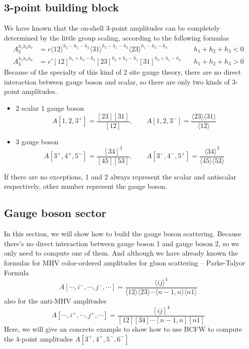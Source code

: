 \documentclass[12pt]{article}
\numberwithin{equation}{section}
\newcommand{\mdavg}[2]{\langle #1 \rangle\!\langle #2 \rangle}
\newcommand{\avg}[1]{\langle #1 \rangle}
\begin{document}
\subsection{3-point building block}
We have known that the on-shell 3-point amplitudes can be completely determined by the little group scaling, according to the following formulas
\begin{align*}
    A_3^{h_1h_2h_3} &= c\avg{12}^{h_3-h_1-h_2}\avg{31}^{h_2-h_1-h_3}\avg{23}^{h_1-h_2-h_3}
    \quad & h_1+h_2+h_3 < 0 \\[0.5em]
    A_3^{h_1h_2h_3} &= c' [12]^{h_1+h_2-h_3}[23]^{h_2+h_3-h_1}[31]^{h_3+h_1-h_2}
    \quad & h_1+h_2+h_3 > 0
\end{align*}
Because of the specialty of this kind of 2 site gauge theory, there are no direct interaction between gauge boson and scalar, so there are only two kinds of 3-point amplitudes.
\begin{itemize}
    \item 2 scalar 1 gauge boson
    \begin{equation}
        A[1,2,3^+]=\frac{[23][31]}{[12]},\qquad A[1,2,3^-]=\frac{\mdavg{23}{31}}{\avg{12}}
    \end{equation}
    \item 3 gauge boson
    \begin{equation}
        A[3^+,4^+,5^-]=\frac{[34]^3}{[45][53]},\qquad A[3^-,4^-,5^+]=\frac{\avg{34}^3}{\mdavg{45}{53}}
    \end{equation}
\end{itemize}
If there are no exceptions, 1 and 2 always represent the scalar and antiscalar respectively, other number represent the gauge boson.  


\subsection{Gauge boson sector}
In this section, we will show how to build the gauge boson scattering. Because there's no direct interaction between gauge boson 1 and gauge boson 2, so we only need to compute one of them.
And although we have already known the formulas for MHV color-ordered amplitudes for gluon scattering -- Parke-Talyor Formula 
\begin{equation}
    A[\cdots,i^-,\cdots,j^-,\cdots]=\frac{\avg{ij}^4}{\mdavg{12}{23}\cdots\mdavg{n-1,n}{n1}}
\end{equation}
also for the anti-MHV amplitudes
\begin{equation}
    A[\cdots,i^+,\cdots,j^+,\cdots]=\frac{[ij]^4}{[12][34]\cdots[n-1,n][n1]}
\end{equation}
Here, we will give an concrete example to show how to use BCFW to compute the 4-point amplitudes $A[3^+,4^+,5^-,6^-]$
\end{document}

